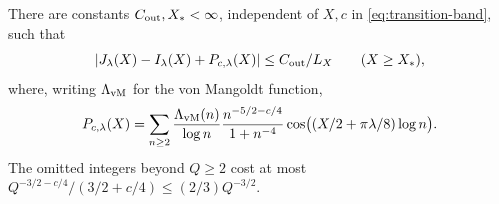 \begin{theorem}\label{thm:outer-baseline}
There are constants \(C_{\rm out},X_*<\infty\), independent of
\(X,c\) in \eqref{eq:transition-band}, such that
\begin{equation}\label{eq:outer-baseline}
 |J_\lambda(X)-I_\lambda(X)+P_{c,\lambda}(X)|
       \le C_{\rm out}/L_X\qquad(X\ge X_*),
\end{equation}
where, writing \(\Lambda_{\rm vM}\) for the von Mangoldt function,
\begin{equation}\label{eq:transition-prime}
 P_{c,\lambda}(X)=\sum_{n\ge2}\frac{\Lambda_{\rm vM}(n)}{\log n}
 \frac{n^{-5/2-c/4}}{1+n^{-4}}
 \cos\bigl((X/2+\pi\lambda/8)\log n\bigr).
\end{equation}
The omitted integers beyond \(Q\ge2\) cost at most
\(Q^{-3/2-c/4}/(3/2+c/4)\le(2/3)Q^{-3/2}\).
\end{theorem}
